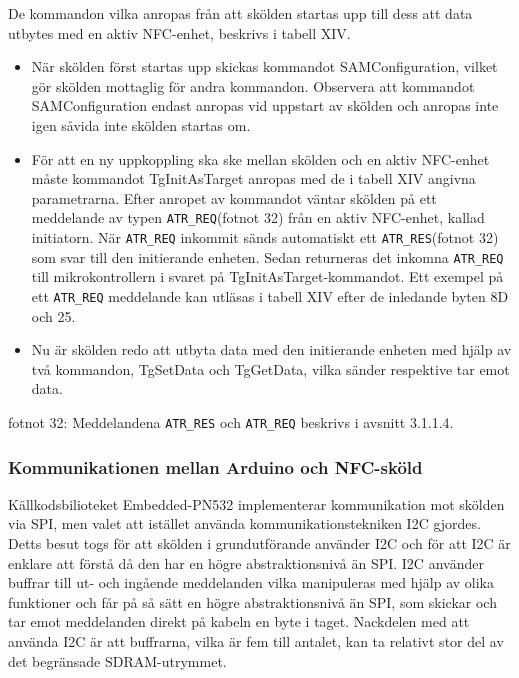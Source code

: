 \documentclass[11pt]{article}
\begin{document}
De kommandon vilka anropas från att skölden startas upp till dess att data utbytes med en aktiv NFC-enhet, beskrivs i tabell XIV. 


\begin{itemize}
\item När skölden först startas upp skickas kommandot SAMConfiguration, vilket gör skölden mottaglig för andra  kommandon. Observera att kommandot SAMConfiguration endast anropas vid uppstart av skölden och anropas inte igen såvida inte skölden startas om.
\item För att en ny uppkoppling ska ske mellan skölden och en aktiv NFC-enhet måste kommandot TgInitAsTarget anropas med de i tabell XIV angivna parametrarna. Efter anropet av kommandot väntar skölden på ett meddelande av typen \texttt{ATR\_REQ}(fotnot 32) från en aktiv NFC-enhet, kallad initiatorn. När \texttt{ATR\_REQ} inkommit sänds automatiskt ett \texttt{ATR\_RES}(fotnot 32) som svar till den initierande enheten. Sedan returneras det inkomna \texttt{ATR\_REQ} till mikrokontrollern i svaret på TgInitAsTarget-kommandot. Ett exempel på ett \texttt{ATR\_REQ} meddelande kan utläsas i tabell XIV efter de inledande byten 8D och 25. 
\item Nu är skölden redo att utbyta data med den initierande enheten med hjälp av två kommandon, TgSetData och TgGetData, vilka sänder respektive tar emot data.
\end{itemize}

fotnot 32: Meddelandena \texttt{ATR\_RES} och \texttt{ATR\_REQ} beskrivs i avsnitt 3.1.1.4.

\subsubsection{Kommunikationen mellan Arduino och NFC-sköld}
Källkodsbilioteket Embedded-PN532 implementerar kommunikation mot skölden via SPI, men valet att istället använda kommunikationstekniken I2C gjordes. Detts besut togs för att skölden i grundutförande använder I2C och för att I2C är enklare att förstå då den har en högre abstraktionsnivå än SPI. I2C använder buffrar till ut- och ingående meddelanden vilka manipuleras med hjälp av olika funktioner och får på så sätt en högre abstraktionsnivå än SPI, som skickar och tar emot meddelanden direkt på kabeln en byte i taget. Nackdelen med att använda I2C är att buffrarna, vilka är fem till antalet, kan ta relativt stor del av det begränsade SDRAM-utrymmet. 
\end{document}
